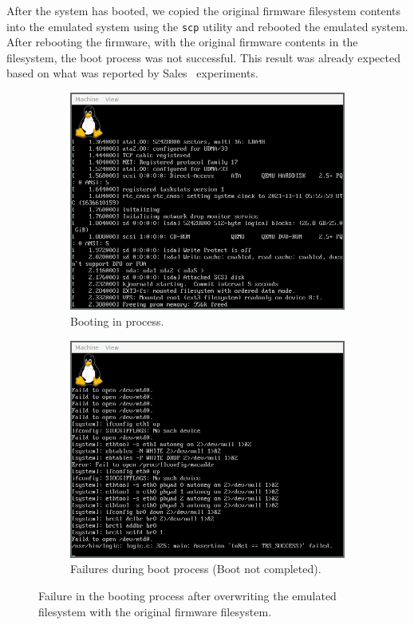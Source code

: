 After the system has booted, we copied the original firmware filesystem contents into the emulated system using the {\tt scp} utility and rebooted the emulated system. After rebooting the firmware, with the original firmware contents in the filesystem, the boot process was not successful. This result was already expected based on what was reported by Sales~\cite{victor-sales} experiments.

\begin{figure}[H]
     \centering
     \begin{subfigure}[b]{0.45\textwidth}
         \centering
         \includegraphics[width=\textwidth]{figs/qemu3.png}
         \caption{Booting in process.}
         \label{fig:qemu-loading}
     \end{subfigure}
     \hfill
     \begin{subfigure}[b]{0.45\textwidth}
         \centering
         \includegraphics[width=\textwidth]{figs/qemu4.png}
         \caption{Failures during boot process (Boot not completed).}
         \label{fig:qemu-booted}
     \end{subfigure}
        \caption{Failure in the booting process after overwriting the emulated filesystem with the original firmware filesystem.}
        \label{fig:qemu-manual-error}
\end{figure}

